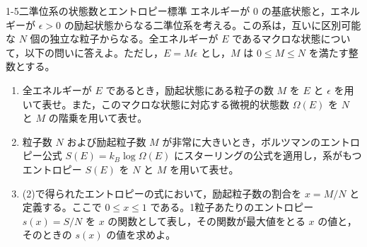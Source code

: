 
\begin{mondai}{1-5}{二準位系の状態数とエントロピー}{標準}
エネルギーが $0$ の基底状態と，エネルギーが $\epsilon > 0$ の励起状態からなる二準位系を考える。この系は，互いに区別可能な $N$ 個の独立な粒子からなる。全エネルギーが $E$ であるマクロな状態について，以下の問いに答えよ。ただし，$E = M\epsilon$ とし，$M$ は $0 \le M \le N$ を満たす整数とする。

\begin{enumerate}
  \item 全エネルギーが $E$ であるとき，励起状態にある粒子の数 $M$ を $E$ と $\epsilon$ を用いて表せ。また，このマクロな状態に対応する微視的状態数 $\Omega(E)$ を $N$ と $M$ の階乗を用いて表せ。

  \item 粒子数 $N$ および励起粒子数 $M$ が非常に大きいとき，ボルツマンのエントロピー公式 $S(E) = k_B \log \Omega(E)$ にスターリングの公式を適用し，系がもつエントロピー $S(E)$ を $N$ と $M$ を用いて表せ。

  \item (2)で得られたエントロピーの式において，励起粒子数の割合を $x = M/N$ と定義する。ここで $0 \le x \le 1$ である。1粒子あたりのエントロピー $s(x) = S/N$ を $x$ の関数として表し，その関数が最大値をとる $x$ の値と，そのときの $s(x)$ の値を求めよ。
\end{enumerate}
\end{mondai}

